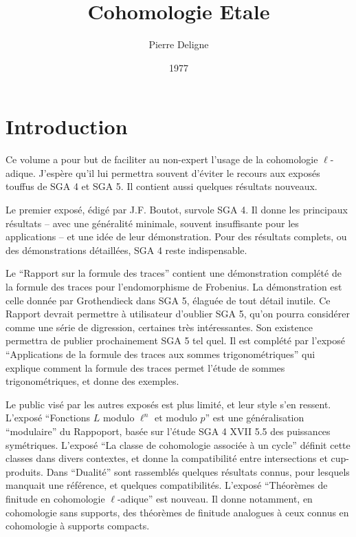 \documentclass{article}
\title{Cohomologie Etale}
\author{Pierre Deligne}
\date{1977}
\begin{document}
\maketitle
\tableofcontents






















\section*{Introduction}

Ce volume a pour but de faciliter au non-expert l'usage de la 
cohomologie $\ell$-adique. J'espère qu'il lui permettra souvent d'éviter le 
recours aux exposés touffus de SGA 4 et SGA 5. Il contient aussi quelques 
résultats nouveaux. 

Le premier exposé, édigé par J.F. Boutot, survole SGA 4. Il donne les 
principaux résultats -- avec une généralité minimale, souvent 
insuffisante pour les applications -- et une idée de leur démonstration. Pour 
des résultats complets, ou des démonstrations détaillées, SGA 4 reste 
indispensable. 

Le ``Rapport sur la formule des traces'' contient une démonstration complété de 
la formule des traces pour l'endomorphisme de Frobenius. La démonstration est 
celle donnée par Grothendieck dans SGA 5, élaguée de tout détail inutile. Ce 
Rapport devrait permettre à utilisateur d'oublier SGA 5, qu'on pourra 
considérer comme une série de digression, certaines très intéressantes. Son 
existence permettra de publier prochainement SGA 5 tel quel. Il est complété 
par l'exposé ``Applications de la formule des traces aux sommes 
trigonométriques'' qui explique comment la formule des traces permet l'étude de 
sommes trigonométriques, et donne des exemples. 

Le public visé par les autres exposés est plus limité, et leur style s'en 
ressent. L'exposé ``Fonctions $L$ modulo $\ell^n$ et modulo $p$'' est une 
généralisation ``modulaire'' du Rappoport, basée sur l'étude SGA 4 XVII 5.5 des 
puissances symétriques. L'exposé ``La classe de cohomologie associée à un 
cycle'' définit cette classes dans divers contextes, et donne la compatibilité 
entre intersections et cup-produits. Dans ``Dualité'' sont rassemblés quelques 
résultats connus, pour lesquels manquait une référence, et quelques 
compatibilités. L'exposé ``Théorèmes de finitude en cohomologie $\ell$-adique'' 
est nouveau. Il donne notamment, en cohomologie sans supports, des théorèmes de 
finitude analogues à ceux connus en cohomologie à supports compacts. 
\end{document}
